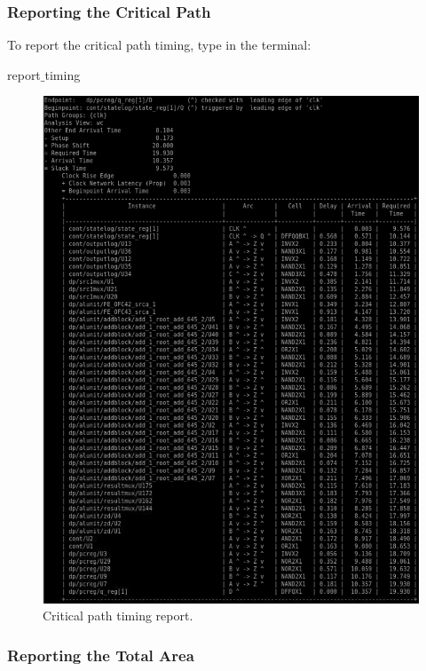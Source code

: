 		\vspace{6mm}
\subsubsection{Reporting the Critical Path}


To report the critical path timing, type in the terminal:
\begin{codeline}
	report$\_$timing
\end{codeline}


\begin{figure}[!h]
	\centering
	\includegraphics[scale=0.5]{figures/lab5_backend/report_timing}
	\caption{Critical path timing report.}
\end{figure}

\clearpage
\subsubsection{Reporting the Total Area}


